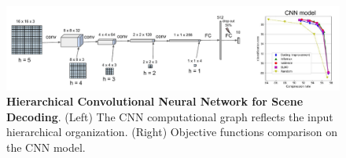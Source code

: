 \documentclass{article}
\begin{document}


\begin{figure}
\centerline{
	\includegraphics[width = \linewidth]{img/NIPS-convolutional.pdf} 
}
\vspace{-.2cm}
\caption{\textbf{Hierarchical Convolutional Neural Network for Scene Decoding}. (Left) The CNN computational graph reflects the input hierarchical organization. (Right) Objective functions comparison on the CNN model.}\label{fig:CNN}
\end{figure}
\end{document}
